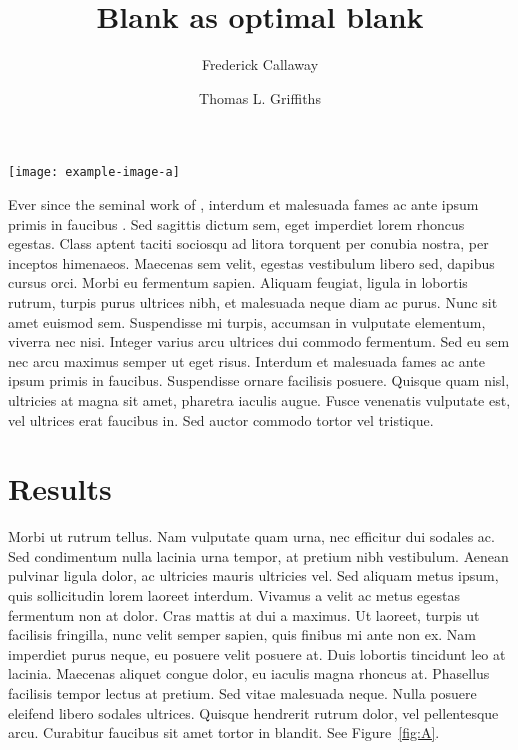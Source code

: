 \documentclass[10pt,twocolumn,letterpaper]{article}
\title{Blank as optimal blank}
\author[a]{Frederick Callaway}
\author[a]{Thomas L. Griffiths}
\affil[a]{Department of Psychology, Princeton University, Princeon, NJ}
\begin{document}

\begin{figure*}[ht!]
    \centering
    \texttt{[image: example-image-a]}
    \caption{A figure.
    }
    \label{fig:A}
\end{figure*}

Ever since the seminal work of \citet{fromer2019goal}, interdum et malesuada fames ac ante ipsum primis in faucibus \citep{fromer2021expectations}. Sed sagittis dictum sem, eget imperdiet lorem rhoncus egestas. Class aptent taciti sociosqu ad litora torquent per conubia nostra, per inceptos himenaeos. Maecenas sem velit, egestas vestibulum libero sed, dapibus cursus orci. Morbi eu fermentum sapien. Aliquam feugiat, ligula in lobortis rutrum, turpis purus ultrices nibh, et malesuada neque diam ac purus. Nunc sit amet euismod sem. Suspendisse mi turpis, accumsan in vulputate elementum, viverra nec nisi. Integer varius arcu ultrices dui commodo fermentum. Sed eu sem nec arcu maximus semper ut eget risus. Interdum et malesuada fames ac ante ipsum primis in faucibus. Suspendisse ornare facilisis posuere. Quisque quam nisl, ultricies at magna sit amet, pharetra iaculis augue. Fusce venenatis vulputate est, vel ultrices erat faucibus in. Sed auctor commodo tortor vel tristique.

\section{Results}
Morbi ut rutrum tellus. Nam vulputate quam urna, nec efficitur dui sodales ac. Sed condimentum nulla lacinia urna tempor, at pretium nibh vestibulum. Aenean pulvinar ligula dolor, ac ultricies mauris ultricies vel. Sed aliquam metus ipsum, quis sollicitudin lorem laoreet interdum. Vivamus a velit ac metus egestas fermentum non at dolor. Cras mattis at dui a maximus. Ut laoreet, turpis ut facilisis fringilla, nunc velit semper sapien, quis finibus mi ante non ex. Nam imperdiet purus neque, eu posuere velit posuere at. Duis lobortis tincidunt leo at lacinia. Maecenas aliquet congue dolor, eu iaculis magna rhoncus at. Phasellus facilisis tempor lectus at pretium. Sed vitae malesuada neque. Nulla posuere eleifend libero sodales ultrices. Quisque hendrerit rutrum dolor, vel pellentesque arcu. Curabitur faucibus sit amet tortor in blandit. See Figure~\ref{fig:A}.
\end{document}
